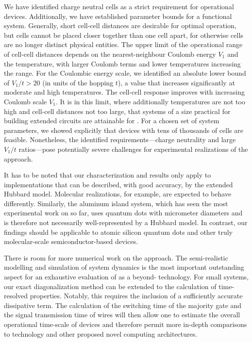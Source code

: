 We have identified charge neutral cells as a strict requirement for operational
 devices. Additionally, we have established parameter bounds for a
functional system. Generally, short cell-cell distances are desirable for
optimal operation, but cells cannot be placed closer together than one cell
apart, for otherwise cells are no longer distinct physical entities. The upper
limit of the operational range of cell-cell distances depends on the
nearest-neighbour Coulomb energy $V_1$ and the temperature, with larger Coulomb
terms and lower temperatures increasing the range. For the Coulombic energy
scale, we identified an absolute lower bound of $V_1/t > 20$ (in units of the
hopping $t$), a value that increases significantly at moderate and high
temperatures. The cell-cell response improves with increasing Coulomb scale
$V_1$. It is in this limit, where additionally temperatures are not too high and
cell-cell distances not too large, that systems of a size practical for building
extended circuits are attainable for . For a chosen set of system
parameters, we showed explicitly that devices with tens of thousands of cells
are feasible. Nonetheless, the identified requirements---charge neutrality and
large $V_1/t$ ratios---pose potentially severe challenges for experimental
realizations of the  approach.

It has to be noted that our characterization and results only apply to
 implementations that can be described, with good accuracy, by the
extended Hubbard model. Molecular  realizations, for example, are
expected to behave differently. Similarly, the aluminum island system, which has
seen the most experimental work on  so far, uses quantum dots with
micrometer diameters and is therefore not necessarily well-represented by a
Hubbard model. In contrast, our findings should be applicable to atomic silicon
quantum dots and other truly molecular-scale semiconductor-based devices.

There is room for more numerical work on the  approach. The
semi-realistic modelling and simulation of system dynamics is the most important
outstanding aspect for an exhaustive evaluation of  as a
beyond- technology. For small systems, our exact diagonalization
method can be extended to the calculation of time-resolved properties. Notably,
this requires the inclusion of a sufficiently accurate dissipative term. The
calculation of the switching time of the majority gate and the signal
transmission time of wires will then allow one to estimate the overall
operational time-scale of  devices and therefore permit more in-depth
comparisons to  technology and other proposed novel computing
architectures.

